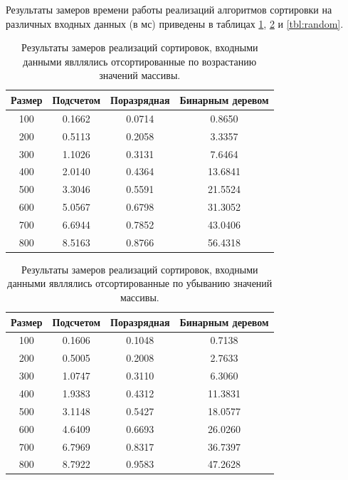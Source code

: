Результаты замеров времени работы реализаций алгоритмов сортировки на различных входных данных (в мс) приведены в таблицах \ref{tbl:best}, \ref{tbl:worth} и \ref{tbl:random}.

\begin{table}[ht!]
	\begin{center}
			\captionsetup{justification=raggedleft,singlelinecheck=off}
			\caption{Результаты замеров реализаций сортировок, входными данными явллялись отсортированные по возрастанию значений массивы.}
			\label{tbl:best}
			\begin{tabular}{|c|c|c|c|}
				\hline
				Размер & Подсчетом &  Поразрядная &  Бинарным деревом \\
				\hline
				100 & 0.1662 & 0.0714 & 0.8650 \\ 
				\hline
				200 & 0.5113 & 0.2058 & 3.3357 \\ 
				\hline
				300 & 1.1026 & 0.3131 & 7.6464 \\ 
				\hline
				400 & 2.0140 & 0.4364 & 13.6841 \\ 
				\hline
				500 & 3.3046 & 0.5591 & 21.5524 \\ 
				\hline
				600 & 5.0567 & 0.6798 & 31.3052 \\ 
				\hline
				700 & 6.6944 & 0.7852 & 43.0406 \\ 
				\hline
				800 & 8.5163 & 0.8766 & 56.4318 \\ 
				\hline
			\end{tabular}
	\end{center}
\end{table}


\begin{table}[ht!]
	\begin{center}
			\captionsetup{justification=raggedleft,singlelinecheck=off}
			\caption{Результаты замеров реализаций сортировок, входными данными явллялись отсортированные по убыванию значений массивы.}
			\label{tbl:worth}
			\begin{tabular}{|c|c|c|c|}
				\hline
				Размер & Подсчетом &  Поразрядная &  Бинарным деревом \\
				\hline
				100 & 0.1606 & 0.1048 & 0.7138 \\ 
				\hline
				200 & 0.5005 & 0.2008 & 2.7633 \\ 
				\hline
				300 & 1.0747 & 0.3110 & 6.3060 \\ 
				\hline
				400 & 1.9383 & 0.4312 & 11.3831 \\ 
				\hline
				500 & 3.1148 & 0.5427 & 18.0577 \\ 
				\hline
				600 & 4.6409 & 0.6693 & 26.0260 \\ 
				\hline
				700 & 6.7969 & 0.8317 & 36.7397 \\ 
				\hline
				800 & 8.7922 & 0.9583 & 47.2628 \\ 
				\hline
			\end{tabular}
	\end{center}
\end{table}

